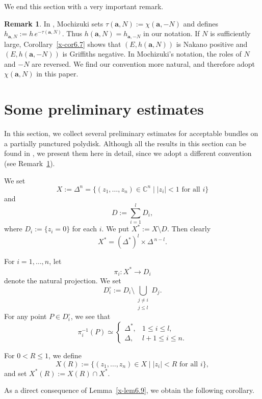 \documentclass[12pt,twoside]{amsart}
\theoremstyle{definition}
\newtheorem{rem}[thm]{Remark}
\begin{document}
We end this section with a very important remark. 

\begin{rem}\label{x-rem6.10}
In \cite[21.2.~Twist of the metric of an acceptable bundle]{mochizuki4}, Mochizuki sets 
$\tau(\bm a,N)
 :=\chi(\bm a,-N)$ and defines $h_{\bm a,N}
 := h\,e^{-\tau(\bm a,N)}$.
Thus $h(\bm a,N)=h_{\bm a,-N}$ in our notation.
If $N$ is sufficiently large, Corollary~\ref{x-cor6.7} shows that
$(E,h(\bm a,N))$ is Nakano positive and
$(E,h(\bm a,-N))$ is Griffiths negative.
In Mochizuki's notation, the roles of $N$ and $-N$ are reversed.
We find our convention more natural, and therefore adopt $\chi(\bm a,N)$
in this paper.
\end{rem}

\section{Some preliminary estimates}\label{x-sec7}

In this section, we collect several preliminary estimates for acceptable 
bundles on a partially punctured polydisk.  
Although all the results in this section can be found in \cite[21.2]{mochizuki4}, 
we present them here in detail, since we adopt a different convention 
(see Remark~\ref{x-rem6.10}).

\medskip

We set
\[
X := \Delta^n = \{ (z_1,\ldots,z_n) \in \mathbb{C}^n \mid |z_i| < 1 \text{ for all } i \}
\]
and
\[
D := \sum_{i=1}^l D_i,
\]
where $D_i := \{ z_i = 0 \}$ for each $i$.  
We put $X^* := X \setminus D$.  
Then clearly
\[
X^* = (\Delta^*)^l \times \Delta^{\,n-l}.
\]

For $i = 1,\ldots,n$, let 
\[
\pi_i \colon X^* \to D_i
\]
denote the natural projection.  
We set
\[
D_i^\circ := D_i \setminus \bigcup_{\substack{j\neq i \\ j \leq l}} D_j.
\]
For any point $P \in D_i^\circ$, we see that 
\[
\pi_i^{-1}(P) \simeq 
\begin{cases}
\Delta^*, & 1 \leq i \leq l,\\[2pt]
\Delta,   & l+1 \leq i \leq n.
\end{cases}
\]

For $0 < R \leq 1$, we define
\[
X(R) := \{ (z_1,\ldots,z_n) \in X \mid |z_i| < R \text{ for all } i \},
\]
and set $X^*(R) := X(R) \cap X^*$.

\medskip

As a direct consequence of Lemma~\ref{x-lem6.9}, we obtain the following corollary.
\end{document}
